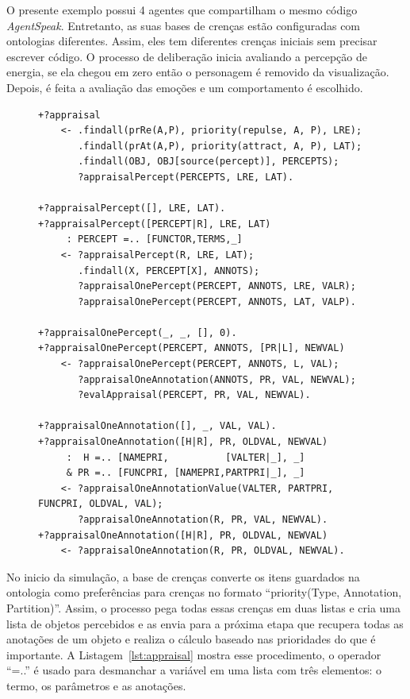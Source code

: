 O presente exemplo possui 4 agentes que compartilham o mesmo código
\emph{AgentSpeak}. Entretanto, as suas bases de crenças estão configuradas com
ontologias diferentes. Assim, eles tem diferentes crenças iniciais sem
precisar escrever código. O processo de deliberação inicia avaliando a
percepção de energia, se ela chegou em zero então o personagem é removido da
visualização. Depois, é feita a avaliação das emoções e um comportamento é
escolhido.

\begin{figure}
\begin{center}
    \begin{minipage}{130mm}
	\lstset{linewidth=130mm}
	\begin{lstlisting}[frame=trbl,
caption=Amostra de código referente ao processo de avaliação considerando as
preferências.,
label=lst:appraisal]
+?appraisal
    <- .findall(prRe(A,P), priority(repulse, A, P), LRE);
       .findall(prAt(A,P), priority(attract, A, P), LAT);
       .findall(OBJ, OBJ[source(percept)], PERCEPTS);
       ?appraisalPercept(PERCEPTS, LRE, LAT).

+?appraisalPercept([], LRE, LAT).
+?appraisalPercept([PERCEPT|R], LRE, LAT)
     : PERCEPT =.. [FUNCTOR,TERMS,_]
    <- ?appraisalPercept(R, LRE, LAT);
       .findall(X, PERCEPT[X], ANNOTS);
       ?appraisalOnePercept(PERCEPT, ANNOTS, LRE, VALR);
       ?appraisalOnePercept(PERCEPT, ANNOTS, LAT, VALP).

+?appraisalOnePercept(_, _, [], 0).
+?appraisalOnePercept(PERCEPT, ANNOTS, [PR|L], NEWVAL)
    <- ?appraisalOnePercept(PERCEPT, ANNOTS, L, VAL);
       ?appraisalOneAnnotation(ANNOTS, PR, VAL, NEWVAL);
       ?evalAppraisal(PERCEPT, PR, VAL, NEWVAL).

+?appraisalOneAnnotation([], _, VAL, VAL).
+?appraisalOneAnnotation([H|R], PR, OLDVAL, NEWVAL)
     :  H =.. [NAMEPRI,          [VALTER|_], _]
     & PR =.. [FUNCPRI, [NAMEPRI,PARTPRI|_], _]
    <- ?appraisalOneAnnotationValue(VALTER, PARTPRI, FUNCPRI, OLDVAL, VAL);
       ?appraisalOneAnnotation(R, PR, VAL, NEWVAL).
+?appraisalOneAnnotation([H|R], PR, OLDVAL, NEWVAL)
    <- ?appraisalOneAnnotation(R, PR, OLDVAL, NEWVAL).
	\end{lstlisting}
    \end{minipage}
\end{center}
\end{figure}

No inicio da simulação, a base de crenças converte os itens guardados na
ontologia como preferências para crenças no formato ``priority(Type,
Annotation, Partition)''. Assim, o processo pega todas essas crenças em duas listas
e cria uma lista de objetos percebidos e as envia para a próxima etapa
que recupera todas as anotações de um objeto e realiza o cálculo baseado nas
prioridades do que é importante. A Listagem~\ref{lst:appraisal} mostra esse
procedimento, o operador ``=..'' é usado para desmanchar a variável em uma
lista com três elementos: o termo, os parâmetros e as anotações.

